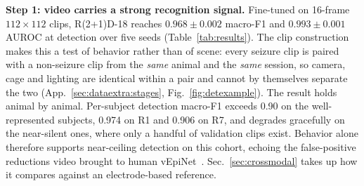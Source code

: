 \noindent\textbf{Step 1: video carries a strong recognition signal.}
Fine-tuned on 16-frame $112\times112$ clips, R(2+1)D-18 reaches $0.968\pm0.002$ macro-F1
and $0.993\pm0.001$ AUROC at detection over five seeds (Table~\ref{tab:results}). The clip construction makes this
a test of behavior rather than of scene: every seizure clip is paired with a
non-seizure clip from the \emph{same} animal and the \emph{same} session, so camera,
cage and lighting are identical within a pair and cannot by themselves separate the
two (App.~\ref{sec:dataextra:stages}, Fig.~\ref{fig:detexample}). The result holds animal by animal. Per-subject detection macro-F1 exceeds 0.90 on the well-represented subjects, 0.974 on R1 and 0.906 on R7, and degrades gracefully on the near-silent ones, where only a handful of validation clips exist. Behavior alone therefore supports near-ceiling detection on this cohort, echoing the false-positive reductions video brought to human vEpiNet~\cite{vepinet2024}. Sec.~\ref{sec:crossmodal} takes up how it compares against an electrode-based reference.

